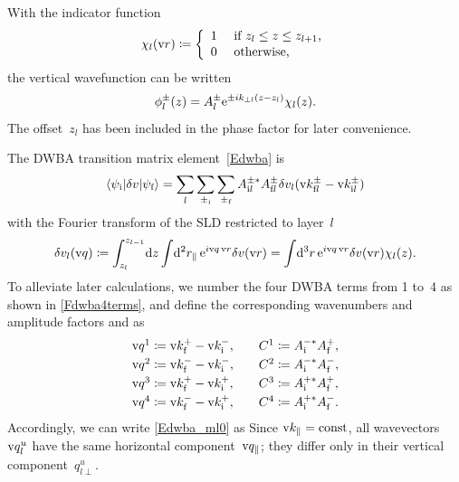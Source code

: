 With the indicator function
%
%
\begin{equation}\label{Echildef}
  \chi_l(\text{v}{r})\coloneqq\left\{\begin{array}{ll}
  1&\text{~if $z_l\le z \le z_{l+1}$,}\\[.2ex]
  0&\text{~otherwise,} \end{array}\right.
\end{equation}
the vertical wavefunction can be written
\begin{equation}\label{Ephizwj}
  \phi^\pm_l(z)=A^\pm_l\mathrm e^{\pm ik_{\perp l}(z-z_l)}\chi_l(z).
\end{equation}
%
The offset~$z_l$ has been included in the phase factor for later convenience.

The DWBA transition matrix element~\cref{Edwba} is
%
\begin{equation}\label{Edwba_ml0}
  \left\langle \psi_{\text{i}}|\delta v|\psi_{\text{f}}\right\rangle
  = \sum_l \sum_{\pm_{\text{i}}} \sum_{\pm_{\text{f}}}
    A^{\pm *}_{\text{i} l} A^\pm_{\text{f} l}
     \delta v_l(\text{v}{k}^\pm_{\text{f} l}-\text{v}{k}^\pm_{\text{i} l})
\end{equation}
with the Fourier transform of the SLD
restricted to layer~$l$
\begin{equation}\label{Echij}
  \delta v_l(\text{v}{q})
  \coloneqq  \int_{z_l}^{z_{l-1}}\!\mathrm d z \int\!\mathrm d^2r_\parallel\, \mathrm e^{i\text{v}{q}\,\text{v}{r}}\delta v(\text{v}{r})
  = \int\!\mathrm d^3r\, \mathrm e^{i\text{v}{q}\,\text{v}{r}}\delta v(\text{v}{r}) \chi_l(z).
\end{equation}
%
To alleviate later calculations,
we number the four DWBA terms from 1 to~4 as shown in \cref{Fdwba4terms},
and define the corresponding wavenumbers and amplitude factors and as
\begin{equation}\label{Eudef}
  \begin{array}{l@{\hspace{2em}}l}
    \q^1 \coloneqq  \k^+_\sf - \k^-_\si,& C^1 \coloneqq  A^{-*}_\si A^+_\sf, \\[.6ex]
    \q^2 \coloneqq  \k^-_\sf - \k^-_\si,& C^2 \coloneqq  A^{-*}_\si A^-_\sf, \\[.6ex]
    \q^3 \coloneqq  \k^+_\sf - \k^+_\si,& C^3 \coloneqq  A^{+*}_\si A^+_\sf, \\[.6ex]
    \q^4 \coloneqq  \k^-_\sf - \k^+_\si,& C^4 \coloneqq  A^{+*}_\si A^-_\sf.
  \end{array}
\end{equation}
Accordingly, we can write \cref{Edwba_ml0} as
Since $\text{v}{k}_\parallel=\text{const}$,
 all wavevectors $\text{v}{q}^u_l$ have the same horizontal component~$\text{v}{q}_\parallel$;
they differ only in their vertical component~$q^u_{l\perp}$.

